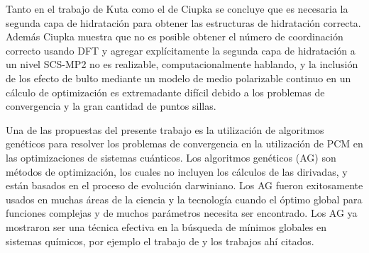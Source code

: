 Tanto en el trabajo de Kuta como el de Ciupka se concluye que es 
necesaria la segunda capa de hidrataci\'on para obtener las 
estructuras de hidrataci\'on correcta. Adem\'as Ciupka muestra que no
es posible obtener el n\'umero de coordinaci\'on correcto usando DFT
y agregar expl\'icitamente la segunda capa de hidrataci\'on a un 
nivel SCS-MP2 no es realizable, computacionalmente hablando, 
y la inclusi\'on de los efecto de bulto mediante un modelo de medio
polarizable continuo en un c\'alculo de optimizaci\'on es 
extremadante dif\'icil debido a los problemas de convergencia y la 
gran cantidad de puntos sillas.

Una de las propuestas del presente trabajo es la utilizaci\'on de
algoritmos gen\'eticos para resolver los problemas de convergencia en
la utilizaci\'on de PCM en las optimizaciones de sistemas cu\'anticos.
Los algoritmos gen\'eticos (AG) son m\'etodos de optimizaci\'on, los 
cuales no incluyen los c\'alculos de las dirivadas, y est\'an basados
en el proceso de evoluci\'on darwiniano. Los AG fueron exitosamente
usados en muchas \'areas de la ciencia y la tecnolog\'ia cuando el 
\'optimo global para funciones complejas y de muchos par\'ametros 
necesita ser encontrado. Los AG ya mostraron ser una t\'ecnica 
efectiva en la b\'usqueda de m\'inimos globales en sistemas
qu\'imicos, por ejemplo el trabajo de \cite{Alex2005} y los trabajos
ah\'i citados.

